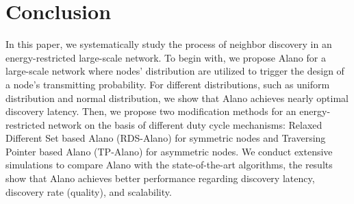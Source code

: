 \section{Conclusion}
\label{Conclusion}
In this paper, we systematically study the process of neighbor discovery in an energy-restricted large-scale network. To begin with, we propose Alano for a large-scale network where nodes' distribution are utilized to trigger the design of a node's transmitting probability. For different distributions, such as uniform distribution and normal distribution, we show that Alano achieves nearly optimal discovery latency. Then, we propose two modification methods for an energy-restricted network on the basis of different duty cycle mechanisms: Relaxed Different Set based Alano (RDS-Alano) for symmetric nodes and Traversing Pointer based Alano (TP-Alano) for asymmetric nodes. We conduct extensive simulations to compare Alano with the state-of-the-art algorithms, the results show that Alano achieves better performance regarding discovery latency, discovery rate (quality), and scalability.%
